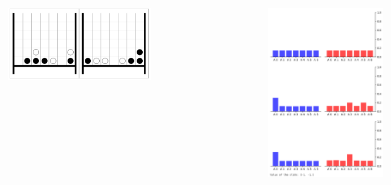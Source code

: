 \documentclass[aspectratio=169,xcolor=dvipsnames]{beamer}
\begin{document}
\begin{frame}{}
    \begin{columns}[c] %
\begin{figure}[h]
    \centering
    \includegraphics[width=0.9\textwidth]{state.png}
    \label{fig:intro}
\end{figure}
\begin{figure}[h]
    \centering
    \includegraphics[width=0.7\textwidth]{prob.png}
    \label{fig:intro}
\end{figure}
    \end{columns}
\end{frame}
\end{document}
